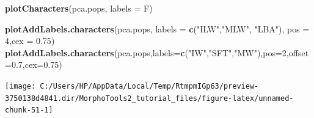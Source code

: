 \documentclass[
]{article}
\newenvironment{Shaded}{\begin{snugshade}}{\end{snugshade}}
\newcommand{\DataTypeTok}[1]{\textcolor[rgb]{0.13,0.29,0.53}{#1}}
\newcommand{\DecValTok}[1]{\textcolor[rgb]{0.00,0.00,0.81}{#1}}
\newcommand{\FloatTok}[1]{\textcolor[rgb]{0.00,0.00,0.81}{#1}}
\newcommand{\KeywordTok}[1]{\textcolor[rgb]{0.13,0.29,0.53}{\textbf{#1}}}
\newcommand{\NormalTok}[1]{#1}
\newcommand{\StringTok}[1]{\textcolor[rgb]{0.31,0.60,0.02}{#1}}
\begin{document}
\begin{Shaded}
\begin{Highlighting}[]
\KeywordTok{plotCharacters}\NormalTok{(pca.pops, }\DataTypeTok{labels =}\NormalTok{ F)}

\KeywordTok{plotAddLabels.characters}\NormalTok{(pca.pops, }\DataTypeTok{labels =} \KeywordTok{c}\NormalTok{(}\StringTok{"ILW"}\NormalTok{,}\StringTok{"MLW"}\NormalTok{, }\StringTok{"LBA"}\NormalTok{), }\DataTypeTok{pos =} \DecValTok{4}\NormalTok{,}\DataTypeTok{cex =} \FloatTok{0.75}\NormalTok{)}
\KeywordTok{plotAddLabels.characters}\NormalTok{(pca.pops,}\DataTypeTok{labels=}\KeywordTok{c}\NormalTok{(}\StringTok{"IW"}\NormalTok{,}\StringTok{"SFT"}\NormalTok{,}\StringTok{"MW"}\NormalTok{),}\DataTypeTok{pos=}\DecValTok{2}\NormalTok{,}\DataTypeTok{offset=}\FloatTok{0.7}\NormalTok{,}\DataTypeTok{cex=}\FloatTok{0.75}\NormalTok{)}
\end{Highlighting}
\end{Shaded}

\begin{center}\texttt{[image: C:/Users/HP/AppData/Local/Temp/RtmpmIGp63/preview-3750138d4841.dir/MorphoTools2\_tutorial\_files/figure-latex/unnamed-chunk-51-1]} \end{center}
\end{document}
